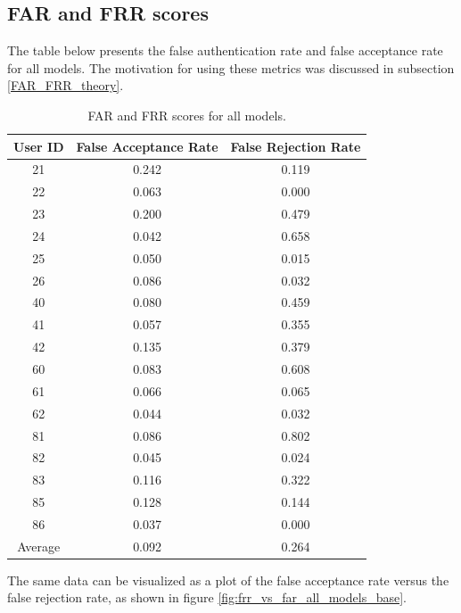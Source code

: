 \subsection{FAR and FRR scores}
The table below presents the false authentication rate and false acceptance rate for all models. The motivation for using these metrics was discussed in subsection \ref{FAR_FRR_theory}.

\begin{center}
\begin{table}[H]
\begin{center}
	\begin{tabular}{ |c|c|c| } 
		\hline
		User ID & False Acceptance Rate & False Rejection Rate \\
		\hline
		21 & 0.242 & 0.119 \\
		\hline
		22 & 0.063 & 0.000 \\
		\hline
		23 & 0.200 & 0.479 \\
		\hline
		24 & 0.042 & 0.658 \\
		\hline
		25 & 0.050 & 0.015 \\
		\hline
		26 & 0.086 & 0.032 \\
		\hline
		40 & 0.080 & 0.459 \\
		\hline
		41 & 0.057 & 0.355 \\
		\hline
		42 & 0.135 & 0.379 \\
		\hline
		60 & 0.083 & 0.608 \\
		\hline
		61 & 0.066 & 0.065 \\
		\hline
		62 & 0.044 & 0.032 \\
		\hline
		81 & 0.086 & 0.802 \\
		\hline
		82 & 0.045 & 0.024 \\
		\hline
		83 & 0.116 & 0.322 \\
		\hline
		85 & 0.128 & 0.144 \\
		\hline
		86 & 0.037 & 0.000 \\
		\hline
		Average & 0.092 & 0.264 \\
		\hline
	\end{tabular}
\end{center}
\caption{FAR and FRR scores for all models.}
\label{table:FAR_FRR_base}
\end{table}
\end{center}

The same data can be visualized as a plot of the false acceptance rate versus the false rejection rate, as shown in figure \ref{fig:frr_vs_far_all_models_base}. 

